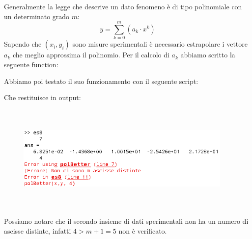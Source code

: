 \begin{flushleft}
Generalmente la legge che descrive un dato fenomeno è di tipo polinomiale con un determinato grado $m$:
\[
y = \sum_{k=0}^{m}(a_k\cdot x^k)
\]
Sapendo che $(x_i,y_i)$ sono misure sperimentali è necessario estrapolare i vettore $a_k$ che meglio approssima il polinomio. Per il calcolo di $a_k$ abbiamo scritto la seguente function:

Abbiamo poi testato il suo funzionamento con il seguente script:

Che restituisce in output:
\begin{figure}[H]
\includegraphics[left, width=400px, height=200px]{cap_4/es8/es48.png}
\end{figure}
Possiamo notare che il secondo insieme di dati sperimentali non ha un numero di ascisse distinte, infatti $4>m+1=5$ non è verificato.
\end{flushleft}